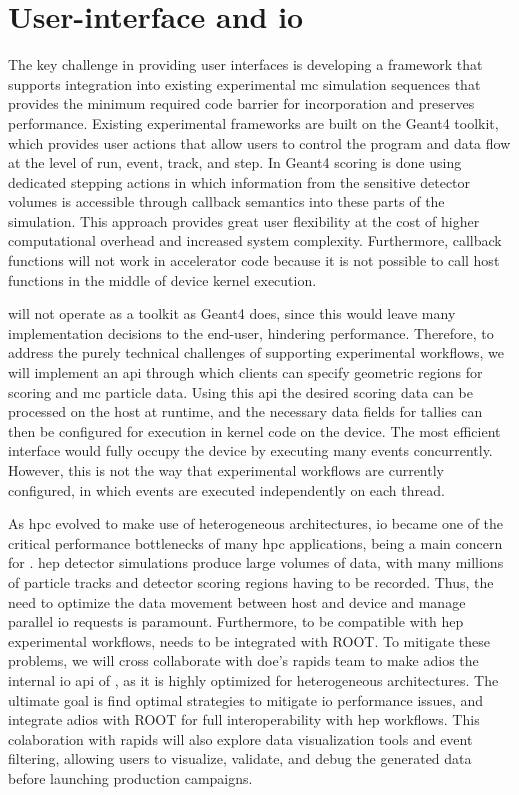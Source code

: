 \section{User-interface and \ac{io}}

The key challenge in providing user interfaces is developing a framework that
supports integration into existing experimental \ac{mc} simulation sequences
that  provides the minimum required code barrier for incorporation and
 preserves performance.  Existing experimental frameworks are built on
the Geant4 toolkit, which provides user actions that allow users to control the
program and data flow at the level of run, event, track, and step. In Geant4
scoring is done using dedicated stepping actions in which information from the
sensitive detector volumes is accessible through callback semantics into these
parts of the simulation.  This approach provides great user flexibility at the
cost of higher computational overhead and increased system complexity.
Furthermore, callback functions will not work in accelerator code because it is
not possible to call host functions in the middle of device kernel execution.

\celeritas will not operate as a toolkit as Geant4 does, since this would leave
many implementation decisions to the end-user, hindering performance. Therefore,
to address the purely technical challenges of supporting experimental workflows,
we will implement an \ac{api} through which clients can specify geometric
regions for scoring and \ac{mc} particle data. Using this \ac{api} the desired
scoring data can be processed on the host at runtime, and the necessary data
fields for tallies can then be configured for execution in kernel code on the
device.  The most efficient interface would fully occupy the device by executing
many events concurrently.  However, this is not the way that experimental
workflows are currently configured, in which events are executed independently
on each thread.

As \ac{hpc} evolved to make use of heterogeneous architectures, \ac{io} became
one of the critical performance bottlenecks of many \ac{hpc} applications, being
a main concern for \celeritas. \ac{hep} detector simulations produce large
volumes of data, with many millions of particle tracks and detector scoring
regions having to be recorded. Thus, the need to optimize the data movement
between host and device and manage parallel \ac{io} requests is paramount.
Furthermore, to be compatible with \ac{hep} experimental workflows, \celeritas
needs to be integrated with ROOT. To mitigate these problems, we will cross
collaborate with \ac{doe}'s \ac{rapids} team to make \ac{adios} the internal
\ac{io} \ac{api} of \celeritas, as it is highly optimized for heterogeneous
architectures. The ultimate goal is find optimal strategies to mitigate \ac{io}
performance issues, and integrate \ac{adios} with ROOT for full interoperability
with \ac{hep} workflows. This colaboration with \ac{rapids} will also explore
data visualization tools and event filtering, allowing users to visualize,
validate, and debug the generated data before launching production campaigns.
